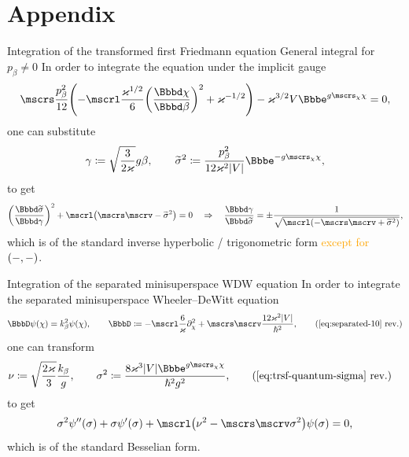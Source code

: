 \documentclass[9pt]{beamer}
\begin{document}
\section*{Appendix}

\begin{frame}%
{Integration of the transformed first Friedmann equation}%
{General integral for $p_\beta \neq 0$}
In order to integrate the equation under the implicit gauge
\begin{align}
\mscrs\frac{p_\beta^2}{12}\rbr{
-\mscrl\frac{\varkappa^{1/2}}{6}\rbr{\frde{\chi}{\beta}}^2
+\varkappa^{-1/2}}
-\varkappa^{3/2}V\ee^{g\mscrs_\chi\chi} = 0,
\end{align}
one can substitute
\begin{align}
\gamma \coloneqq \sqrt{\frac{3}{2\varkappa}}g\beta, \qquad
\widetilde{\sigma}^2 \coloneqq \frac{p_\beta^2}{12\varkappa^2 \vbr{V}}
\ee^{-g\mscrs_\chi\chi},
\end{align}
to get
\begin{align}
\rbr{\frde{\widetilde{\sigma}}{\gamma}}^2
+\mscrl\rbr{\mscrs\mscrv - \widetilde{\sigma}^2} = 0
\quad\Rightarrow\quad
\frde{\gamma}{\widetilde{\sigma}} = \pm
\frac{1}{\sqrt{\mscrl\rbr{- \mscrs\mscrv + \widetilde{\sigma}^2}}},
\end{align}
which is of the standard inverse hyperbolic / trigonometric form
\textcolor{orange}{except for ${\left(-,-\right)}$}.
\end{frame}

\begin{frame}%
{Integration of the separated minisuperspace WDW equation}%
In order to integrate the separated minisuperspace Wheeler--DeWitt equation
\begin{align}
\BbbD \rfun{\psi}{\chi} = k_\beta^2 \rfun{\psi}{\chi},\qquad
\BbbD \coloneqq
-\mscrl \frac{6}{\varkappa} \partial_\chi^2
+ \mscrs\mscrv \frac{12\varkappa^2\vbr{V}}{\hslash^2},
\tag{\ref{eq:separated-10} rev.}
\end{align}
one can transform
\begin{align}
\nu &\coloneqq \sqrt{\frac{2\varkappa}{3}}\frac{k_\beta}{g},\qquad
\sigma^2 \coloneqq 
\frac{8\varkappa^3\vbr{V}\ee^{g\mscrs_\chi\chi}}{\hslash^2 g^2},
\tag{\ref{eq:trsf-quantum-sigma} rev.}
\end{align}
to get
\begin{align}
\sigma^2\rfun{\psi''}{\sigma}
+\sigma\rfun{\psi'}{\sigma}
+\mscrl\rbr{\nu^2-\mscrs\mscrv\sigma^2}\rfun{\psi}{\sigma} = 0,
\end{align}
which is of the standard Besselian form.
\end{frame}
\end{document}
